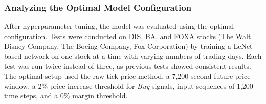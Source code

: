 \documentclass[a4paper,oneside,onecolumn,12pt]{book}
\begin{document}
		\subsubsection{Analyzing the Optimal Model Configuration}
		After hyperparameter tuning, the model was evaluated using the optimal configuration. Tests were conducted on DIS, BA, and FOXA stocks (The Walt Disney Company, The Boeing Company, Fox Corporation) by training a LeNet based network on one stock at a time with varying numbers of trading days. Each test was run twice instead of three, as previous tests showed consistent results. The optimal setup used the raw tick price method, a 7,200 second future price window, a 2\% price increase threshold for \textit{Buy} signals, input sequences of 1,200 time steps, and a 0\% margin threshold.

		\begin{table}[H]
			\begin{center}
			\end{center}
			\caption{Testing the model with the optimal configuration.}
			\label{table:opt_model_tests}
		\end{table}
\end{document}
